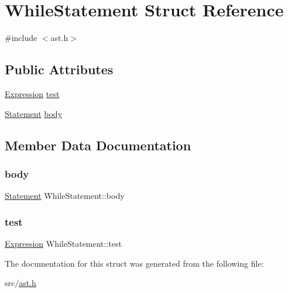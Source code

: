\hypertarget{struct_while_statement}{}\section{While\+Statement Struct Reference}
\label{struct_while_statement}


{\ttfamily \#include $<$ast.\+h$>$}

\subsection*{Public Attributes}
\begin{DoxyCompactItemize}
\item 
\hyperlink{ast_8h_a4cb273a4d960cd13ea17d08f254493e8}{Expression} \hyperlink{struct_while_statement_a4990cb7a5253b0a8abb3c8a6e0b090f0}{test}
\item 
\hyperlink{ast_8h_a8b6ddf3732a0acd77e6b2509fb21a5fd}{Statement} \hyperlink{struct_while_statement_ab86fce90fef019497eeac60206f3052b}{body}
\end{DoxyCompactItemize}


\subsection{Member Data Documentation}
\mbox{\label{struct_while_statement_ab86fce90fef019497eeac60206f3052b}} 
\subsubsection{\texorpdfstring{body}{body}}
{\footnotesize\ttfamily \hyperlink{ast_8h_a8b6ddf3732a0acd77e6b2509fb21a5fd}{Statement} While\+Statement\+::body}

\mbox{\label{struct_while_statement_a4990cb7a5253b0a8abb3c8a6e0b090f0}} 
\subsubsection{\texorpdfstring{test}{test}}
{\footnotesize\ttfamily \hyperlink{ast_8h_a4cb273a4d960cd13ea17d08f254493e8}{Expression} While\+Statement\+::test}



The documentation for this struct was generated from the following file\+:\begin{DoxyCompactItemize}
\item 
src/\hyperlink{ast_8h}{ast.\+h}\end{DoxyCompactItemize}

